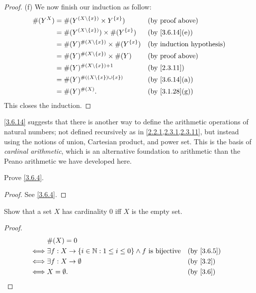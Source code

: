 \begin{proof}{(f)}
  We now finish our induction as follow:
  \begin{align*}
    \#(Y^X) & = \#(Y^{(X \setminus \{x\})} \times Y^{\{x\}})       &  & \text{(by proof above)}      \\
            & = \#(Y^{(X \setminus \{x\})}) \times \#(Y^{\{x\}})   &  & \text{(by \cref{3.6.14}(e))} \\
            & = \#(Y)^{\#(X \setminus \{x\})} \times \#(Y^{\{x\}}) &  & \byIH                        \\
            & = \#(Y)^{\#(X \setminus \{x\})} \times \#(Y)         &  & \text{(by proof above)}      \\
            & = \#(Y)^{\#(X \setminus \{x\}) + 1}                  &  & \by{2.3.11}                  \\
            & = \#(Y)^{\#((X \setminus \{x\}) \cup \{x\})}         &  & \text{(by \cref{3.6.14}(a))} \\
            & = \#(Y)^{\#(X)}.                                     &  & \text{(by \cref{3.1.28}(g))}
  \end{align*}
  This closes the induction.
\end{proof}

\begin{rmk}\label{3.6.15}
  \cref{3.6.14} suggests that there is another way to define the arithmetic operations of natural numbers;
  not defined recursively as in \cref{2.2.1,2.3.1,2.3.11}, but instead using the notions of union, Cartesian product, and power set.
  This is the basis of \emph{cardinal arithmetic}, which is an alternative foundation to arithmetic than the Peano arithmetic we have developed here.
\end{rmk}

\exercisesection

\begin{ex}\label{ex:3.6.1}
  Prove \cref{3.6.4}.
\end{ex}

\begin{proof}
  See \cref{3.6.4}.
\end{proof}

\begin{ex}\label{ex:3.6.2}
  Show that a set \(X\) has cardinality \(0\) iff \(X\) is the empty set.
\end{ex}

\begin{proof}
  \begin{align*}
         & \#(X) = 0                                                                                                 \\
    \iff & \exists f : X \to \{i \in \N : 1 \leq i \leq 0\} \land f \text{ is bijective} &  & \by{3.6.5}             \\
    \iff & \exists f : X \to \emptyset                                                   &  & \text{(by \cref{3.2})} \\
    \iff & X = \emptyset.                                                                &  & \text{(by \cref{3.6})}
  \end{align*}
\end{proof}

